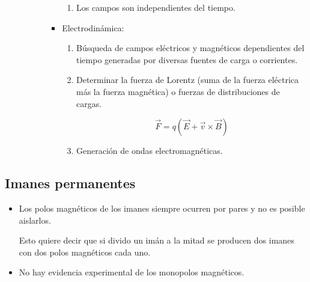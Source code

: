 \documentclass[a4paper,10pt]{article}
\begin{document}
\begin{itemize}
\begin{itemize}
\begin{itemize}
\begin{itemize}
\begin{enumerate}
                \item Los campos son independientes del tiempo.
                
                \end{enumerate}
            
            \item Electrodinámica:
            
                \begin{enumerate}
                
                \item Búsqueda de campos eléctricos y magnéticos dependientes
                del tiempo generadas por diversas fuentes de carga o corrientes.
                
                \item Determinar la fuerza de Lorentz (suma de la fuerza
                eléctrica más la fuerza magnética) o fuerzas de distribuciones
                de cargas.
                
                \begin{equation*}
                    \boxed{\vec{F}=q(\vec{E}+\vec{v}\times\vec{B})}
                \end{equation*}

                \item Generación de ondas electromagnéticas.
                
                \end{enumerate}

            \end{itemize}
        
        \end{itemize}
        
    \end{itemize}
    
\end{itemize}

\subsection{Imanes permanentes}

\begin{itemize}
    
\item Los polos magnéticos de los imanes siempre ocurren por pares
y no es posible aislarlos.

Esto quiere decir que si divido un imán a la mitad se producen dos
imanes con dos polos magnéticos cada uno.

\item No hay evidencia experimental de los monopolos magnéticos.

\end{itemize}
\end{document}

